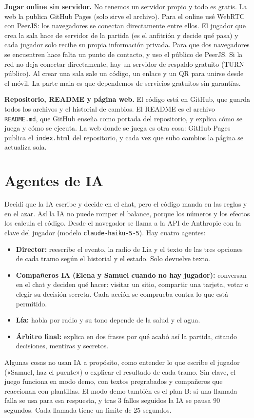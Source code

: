 \documentclass[11pt,a4paper]{article}
\begin{document}
\textbf{Jugar online sin servidor.} No tenemos un servidor propio y todo es gratis. La web la publica GitHub Pages (solo sirve el archivo). Para el online usé WebRTC con PeerJS: los navegadores se conectan directamente entre ellos. El jugador que crea la sala hace de servidor de la partida (es el anfitrión y decide qué pasa) y cada jugador solo recibe su propia información privada. Para que dos navegadores se encuentren hace falta un punto de contacto, y uso el público de PeerJS. Si la red no deja conectar directamente, hay un servidor de respaldo gratuito (TURN público). Al crear una sala sale un código, un enlace y un QR para unirse desde el móvil. La parte mala es que dependemos de servicios gratuitos sin garantías.

\textbf{Repositorio, README y página web.} El código está en GitHub, que guarda todos los archivos y el historial de cambios. El README es el archivo \texttt{README.md}, que GitHub enseña como portada del repositorio, y explica cómo se juega y cómo se ejecuta. La web donde se juega es otra cosa: GitHub Pages publica el \texttt{index.html} del repositorio, y cada vez que subo cambios la página se actualiza sola.

\section{Agentes de IA}
Decidí que la IA escribe y decide en el chat, pero el código manda en las reglas y en el azar. Así la IA no puede romper el balance, porque los números y los efectos los calcula el código. Desde el navegador se llama a la API de Anthropic con la clave del jugador (modelo \texttt{claude-haiku-5-5}). Hay cuatro agentes:
\begin{itemize}
\item \textbf{Director:} reescribe el evento, la radio de Lía y el texto de las tres opciones de cada tramo según el historial y el estado. Solo devuelve texto.
\item \textbf{Compañeros IA (Elena y Samuel cuando no hay jugador):} conversan en el chat y deciden qué hacer: visitar un sitio, compartir una tarjeta, votar o elegir su decisión secreta. Cada acción se comprueba contra lo que está permitido.
\item \textbf{Lía:} habla por radio y su tono depende de la salud y el agua.
\item \textbf{Árbitro final:} explica en dos frases por qué acabó así la partida, citando decisiones, mentiras y secretos.
\end{itemize}
Algunas cosas no usan IA a propósito, como entender lo que escribe el jugador («Samuel, haz el puente») o explicar el resultado de cada tramo. Sin clave, el juego funciona en modo demo, con textos pregrabados y compañeros que reaccionan con plantillas. El modo demo también es el plan B: si una llamada falla se usa para esa respuesta, y tras 3 fallos seguidos la IA se pausa 90 segundos. Cada llamada tiene un límite de 25 segundos.
\end{document}
